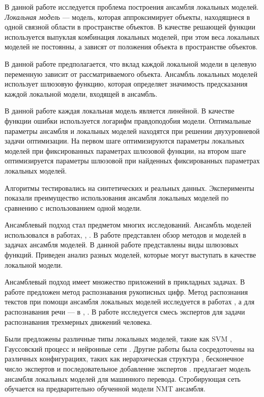 \documentclass[12pt, twoside]{article}
\begin{document}
В данной работе исследуется проблема построения ансамбля локальных моделей. \textit{Локальная модель} --- модель, которая аппроксимирует объекты, находящиеся в одной связной области в пространстве объектов. В качестве решающей функции используется выпуклая комбинация локальных моделей, при этом веса локальных моделей не постоянны, а зависят от положения объекта в пространстве объектов. 

В данной работе предполагается, что вклад каждой локальной модели в целевую переменную зависит от рассматриваемого объекта. Ансамбль локальных моделей использует шлюзовую функцию, которая определяет значимость предсказания каждой локальной модели, входящей в ансамбль.

В данной работе каждая локальная модель является линейной. В качестве функции ошибки используется логарифм правдоподобия модели. Оптимальные параметры ансамбля и локальных моделей находятся при решении двухуровневой задачи оптимизации. На первом шаге оптимизируются параметры локальных моделей при фиксированных параметрах шлюзовой функции, на втором шаге оптимизируется параметры шлюзовой при найденных фиксированных параметрах локальных моделей. 

Алгоритмы тестировались на синтетических и реальных данных.  Эксперименты показали преимущество использования ансамбля локальных моделей по сравнению с использованием одной модели.

Ансамблевый подход стал предметом многих исследований. Ансамбль моделей использовался в работах\cite{Yumlu2003}, \cite{Cheung1995}, \cite{Weigend2000}. В работе \cite{Yuksel2012} представлен обзор методов и моделей в задачах ансамбля моделей. В данной работе представлены виды шлюзовых функций. Приведен анализ разных моделей, которые могут выступать в качестве локальной модели. 

Ансамблевый подход имеет множество приложений в прикладных задачах. В работе \cite{article} предложен метод распознавания рукописных цифр. Метод распознания текстов при помощи ансамбля локальных моделей исследуется в работах \cite{Estabrooks2001}, а для распознавания речи --- в \cite{Mossavat2010}, \cite{Peng1996}. В работе \cite{Sminchisescu2007} исследуется смесь экспертов для задачи распознавания трехмерных движений человека.


Были предложены различные типы локальных моделей, такие как SVM \cite{Collobert2002}, Гауссовский процесс \cite{Tresp01mixturesof}  и нейронные сети \cite{Shazeer2017}. Другие работы была сосредоточены на различных конфигурациях, таких как иерархическая структура \cite{NIPS1991_514}, бесконечное число экспертов \cite{Rasmussen} и последовательное добавление экспертов \cite{Aljundi2016}. \cite{garmash-monz-2016-ensemble} предлагает модель ансамбля локальных моделей для машинного перевода. Стробирующая сеть обучается на предварительно обученной модели NMT ансамбля. 
\end{document}
